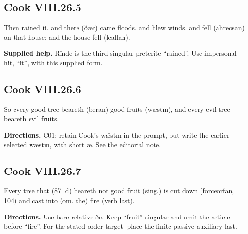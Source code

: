 \par\begin{minipage}{\linewidth}\raggedright
\subsection*{Cook VIII.26.5}

Then rained it, and there (ðǣr) came floods, and blew winds, and fell (āhrēosan) on that house; and the house fell (feallan).

\end{minipage}\par\addvspace{4pt}

\textbf{Supplied help.} Rīnde is the third singular preterite “rained”. Use impersonal hit, “it”, with this supplied form.

\par\begin{minipage}{\linewidth}\raggedright
\subsection*{Cook VIII.26.6}

So every good tree beareth (beran) good fruits (wǣstm), and every evil tree beareth evil fruits.

\textbf{Directions.} C01: retain Cook’s wǣstm in the prompt, but write the earlier selected wæstm, with short æ. See the editorial note.

\end{minipage}\par\addvspace{4pt}

\par\begin{minipage}{\linewidth}\raggedright
\subsection*{Cook VIII.26.7}

Every tree that (87. d) beareth not good fruit (sing.) is cut down (forceorfan, 104) and cast into (om. the) fire (verb last).

\textbf{Directions.} Use bare relative ðe. Keep “fruit” singular and omit the article before “fire”. For the stated order target, place the finite passive auxiliary last.

\end{minipage}\par\addvspace{4pt}

